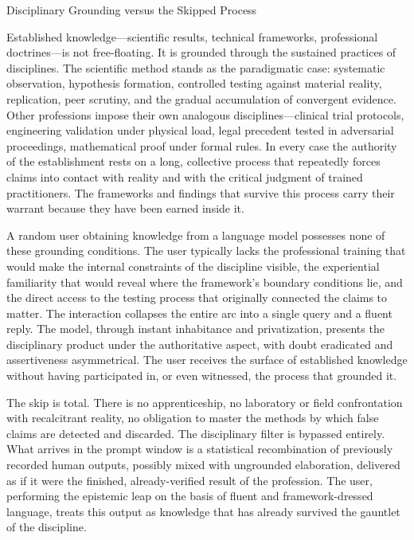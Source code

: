Disciplinary Grounding versus the Skipped Process

Established knowledge—scientific results, technical frameworks, professional doctrines—is not free-floating. It is grounded through the sustained practices of disciplines. The scientific method stands as the paradigmatic case: systematic observation, hypothesis formation, controlled testing against material reality, replication, peer scrutiny, and the gradual accumulation of convergent evidence. Other professions impose their own analogous disciplines—clinical trial protocols, engineering validation under physical load, legal precedent tested in adversarial proceedings, mathematical proof under formal rules. In every case the authority of the establishment rests on a long, collective process that repeatedly forces claims into contact with reality and with the critical judgment of trained practitioners. The frameworks and findings that survive this process carry their warrant because they have been earned inside it.

A random user obtaining knowledge from a language model possesses none of these grounding conditions. The user typically lacks the professional training that would make the internal constraints of the discipline visible, the experiential familiarity that would reveal where the framework’s boundary conditions lie, and the direct access to the testing process that originally connected the claims to matter. The interaction collapses the entire arc into a single query and a fluent reply. The model, through instant inhabitance and privatization, presents the disciplinary product under the authoritative aspect, with doubt eradicated and assertiveness asymmetrical. The user receives the surface of established knowledge without having participated in, or even witnessed, the process that grounded it.

The skip is total. There is no apprenticeship, no laboratory or field confrontation with recalcitrant reality, no obligation to master the methods by which false claims are detected and discarded. The disciplinary filter is bypassed entirely. What arrives in the prompt window is a statistical recombination of previously recorded human outputs, possibly mixed with ungrounded elaboration, delivered as if it were the finished, already-verified result of the profession. The user, performing the epistemic leap on the basis of fluent and framework-dressed language, treats this output as knowledge that has already survived the gauntlet of the discipline.

